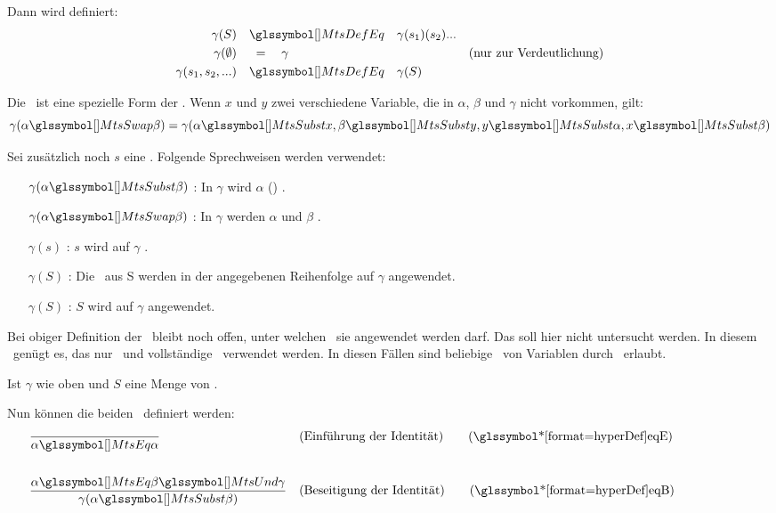 {Dann wird definiert:
\begin{align}
	\gamma(S) & \quad \MtsDefEq \quad \gamma(s_1)(s_2)... \label{def-ErsetzungenAlt}\\
	\gamma(\emptyset) & \quad \; = \quad \gamma & \text{(nur zur Verdeutlichung)}\\
	\gamma(s_1,s_2,...) & \quad \MtsDefEq \quad \gamma(S)
\end{align}

Die \Vertauschung\ ist eine spezielle Form der \Ersetzung.
Wenn $x$ und $y$ zwei verschiedene Variable, die in $\alpha$, $\beta$ und $\gamma$ nicht vorkommen, gilt:
\[
	\gamma(\alpha \MtsSwap \beta) = \gamma(\alpha\MtsSubst x, \beta\MtsSubst y,  y\MtsSubst\alpha, x \MtsSubst\beta)
\]

Sei zusätzlich noch $s$ eine \Ersetzung.
Folgende Sprechweisen werden verwendet:
\begin{itemize}
	\renewcommand*{\itemindent}{1,5cm}
	\renewcommand*{\labelsep}{5pt}
	\item [$\gamma(\alpha \MtsSubst \beta)$ :] In $\gamma$ wird $\alpha$ () .
	\item [$\gamma(\alpha \MtsSwap  \beta)$ :] In $\gamma$ werden $\alpha$ und $\beta$ .
	\item [$\gamma(s)$ :] $s$ wird auf $\gamma$ .
	\item [$\gamma(S)$ :] Die \Ersetzungen\ aus S werden in der angegebenen Reihenfolge auf $\gamma$ angewendet.
	\item [$\gamma(S)$ :] $S$ wird auf $\gamma$ angewendet.
\end{itemize}
%
Bei obiger Definition der \Ersetzung\ bleibt noch offen, unter welchen \Voraussetzungen\ sie angewendet werden darf. Das soll hier nicht untersucht werden. In diesem \sectionname\ genügt es, das nur \Vertauschung\ und vollständige \Ersetzung\ verwendet werden.
In diesen Fällen sind beliebige \Ersetzungen\ von Variablen durch \Formeln\ erlaubt.

Ist $\gamma$ wie oben und $S$ eine Menge von \Ersetzungen.

Nun können die beiden \Identitaetsregeln\ definiert werden:
\begin{align}
	& \frac{}{\alpha\MtsEq\alpha}
	& & (\text{Einführung der Identität})
	\tag{\tageqE} \label{def-eqE}
	\\\\
	& \frac{\alpha\MtsEq\beta \MtsUnd \gamma}{\gamma(\alpha\MtsSubst\beta)}
	& & (\text{Beseitigung der Identität})
	\tag{\tageqB} \label{def-eqB}
	\formulatoleft
\end{align}

}
